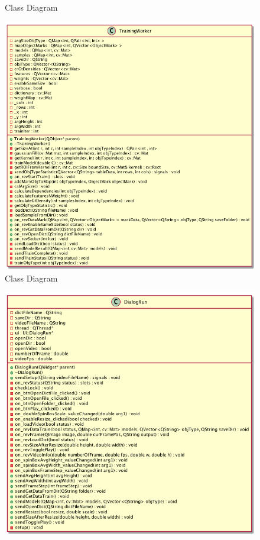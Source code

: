 \begin{center}
\begin{figure}[H]
    \caption{Class Diagram}
    \label{fig:cd-train}
  \end{figure}
  \begin{figure}[H]
    \centering
    \includegraphics[height=0.68\textheight]{Chapters/Fig/wtraind}
    \caption{Class Diagram}
    \label{fig:cd-tworker}
  \end{figure}
  \begin{figure}[H]
    \centering
    \includegraphics[height=0.6\textheight]{Chapters/Fig/drund}

\end{figure}
\end{center}
